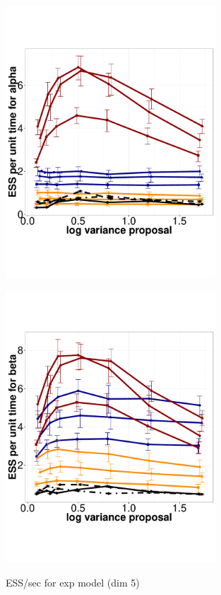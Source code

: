   \begin{figure}%
  \centering
  \begin{minipage}[hp]{0.45\linewidth}
  \centering
    \includegraphics [width=0.70\textwidth, angle=0]{figs/exp_5_alpha.pdf}
      \end{minipage}
  \begin{minipage}[hp]{0.45\linewidth}
  \centering
    \includegraphics [width=0.70\textwidth, angle=0]{figs/exp_5_beta.pdf}
    \vspace{-0 in}
     \label{fig:ESS_EXP_D5}
  \end{minipage}
    \caption{ESS/sec for exp model (dim 5)}
  \end{figure}

